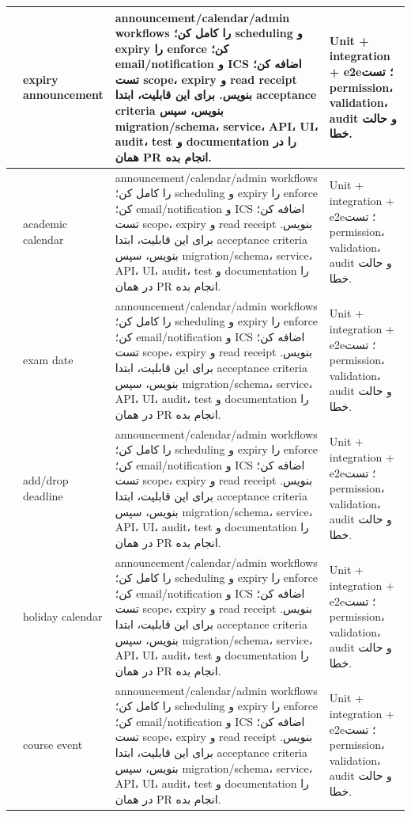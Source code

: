 \documentclass[11pt,a4paper]{article}
\begin{document}
\begin{longtable}{|>{\raggedleft\arraybackslash}p{}|>{\raggedleft\arraybackslash}p{}|>{\raggedleft\arraybackslash}p{}|>{\raggedleft\arraybackslash}p{}|}
286 & expiry announcement & announcement/calendar/admin workflows را کامل کن؛ scheduling و expiry را enforce کن؛ email/notification و ICS اضافه کن؛ تست scope، expiry و read receipt بنویس. برای این قابلیت، ابتدا acceptance criteria بنویس، سپس migration/schema، service، API، UI، audit، test و documentation را در همان PR انجام بده. & Unit + integration + e2e؛ تست permission، validation، audit و حالت خطا. \\ \hline
287 & academic calendar & announcement/calendar/admin workflows را کامل کن؛ scheduling و expiry را enforce کن؛ email/notification و ICS اضافه کن؛ تست scope، expiry و read receipt بنویس. برای این قابلیت، ابتدا acceptance criteria بنویس، سپس migration/schema، service، API، UI، audit، test و documentation را در همان PR انجام بده. & Unit + integration + e2e؛ تست permission، validation، audit و حالت خطا. \\ \hline
288 & exam date & announcement/calendar/admin workflows را کامل کن؛ scheduling و expiry را enforce کن؛ email/notification و ICS اضافه کن؛ تست scope، expiry و read receipt بنویس. برای این قابلیت، ابتدا acceptance criteria بنویس، سپس migration/schema، service، API، UI، audit، test و documentation را در همان PR انجام بده. & Unit + integration + e2e؛ تست permission، validation، audit و حالت خطا. \\ \hline
289 & add/drop deadline & announcement/calendar/admin workflows را کامل کن؛ scheduling و expiry را enforce کن؛ email/notification و ICS اضافه کن؛ تست scope، expiry و read receipt بنویس. برای این قابلیت، ابتدا acceptance criteria بنویس، سپس migration/schema، service، API، UI، audit، test و documentation را در همان PR انجام بده. & Unit + integration + e2e؛ تست permission، validation، audit و حالت خطا. \\ \hline
290 & holiday calendar & announcement/calendar/admin workflows را کامل کن؛ scheduling و expiry را enforce کن؛ email/notification و ICS اضافه کن؛ تست scope، expiry و read receipt بنویس. برای این قابلیت، ابتدا acceptance criteria بنویس، سپس migration/schema، service، API، UI، audit، test و documentation را در همان PR انجام بده. & Unit + integration + e2e؛ تست permission، validation، audit و حالت خطا. \\ \hline
291 & course event & announcement/calendar/admin workflows را کامل کن؛ scheduling و expiry را enforce کن؛ email/notification و ICS اضافه کن؛ تست scope، expiry و read receipt بنویس. برای این قابلیت، ابتدا acceptance criteria بنویس، سپس migration/schema، service، API، UI، audit، test و documentation را در همان PR انجام بده. & Unit + integration + e2e؛ تست permission، validation، audit و حالت خطا. \\ \hline

\end{longtable}
\end{document}
